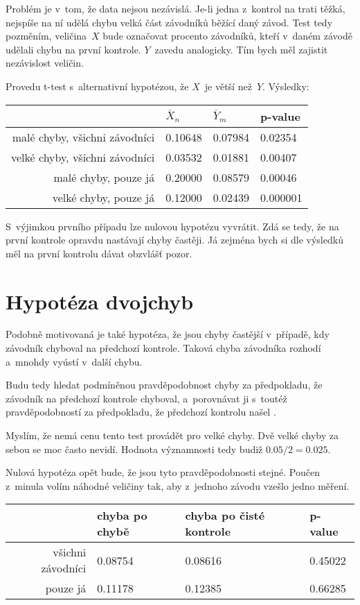 \documentclass[a4paper,11pt]{article}
\begin{document}
Problém je v~tom, že data nejsou nezávislá. Je-li jedna z~kontrol na trati
těžká, nejspíše na ní udělá chybu velká část závodníků běžící daný závod. Test
tedy pozměním, veličina~$X$ bude označovat procento závodníků, kteří v~daném
závodě udělali chybu na první kontrole. $Y$~zavedu analogicky. Tím bych měl
zajistit nezávislost veličin.

Provedu t-test s~alternativní hypotézou, že $X$~je větší než~$Y$. Výsledky:

\begin{tabular}{r | l | l | l}
     & $\overline{X}_n$ & $\overline{Y}_m$ & p-value  \\
    \hline
    malé chyby, všichni závodníci  & 0.10648 & 0.07984 & 0.02354  \\
    velké chyby, všichni závodníci & 0.03532 & 0.01881 & 0.00407  \\
    malé chyby, pouze já           & 0.20000 & 0.08579 & 0.00046  \\
    velké chyby, pouze já          & 0.12000 & 0.02439 & 0.000001 \\
\end{tabular}

S~výjimkou prvního případu lze nulovou hypotézu vyvrátit. Zdá se tedy, že na
první kontrole opravdu nastávají chyby častěji. Já zejména bych si dle výsledků
měl na první kontrolu dávat obzvlášť pozor.

\section*{Hypotéza dvojchyb}

Podobně motivovaná je také hypotéza, že jsou chyby častější v~případě, kdy
závodník chyboval na předchozí kontrole. Taková chyba závodníka rozhodí a~mnohdy
vyústí v~další chybu.

Budu tedy hledat podmíněnou pravděpodobnost chyby za předpokladu, že závodník na
předchozí kontrole chyboval, a~porovnávat ji s~toutéž pravděpodobností za
předpokladu, že předchozí kontrolu našel .

Myslím, že nemá cenu tento test provádět pro velké chyby. Dvě velké chyby za
sebou se moc často nevidí. Hodnota významnosti tedy budiž $0.05 / 2 = 0.025$.

Nulová hypotéza opět bude, že jsou tyto pravděpodobnosti stejné. Poučen z~minula
volím náhodné veličiny tak, aby z~jednoho závodu vzešlo jedno měření.

\begin{tabular}{r | l | l | l}
    & chyba po chybě & chyba po čisté kontrole & p-value \\
   \hline
   všichni závodníci  & 0.08754 & 0.08616 & 0.45022 \\
   pouze já           & 0.11178 & 0.12385 & 0.66285 \\
\end{tabular}
\end{document}
